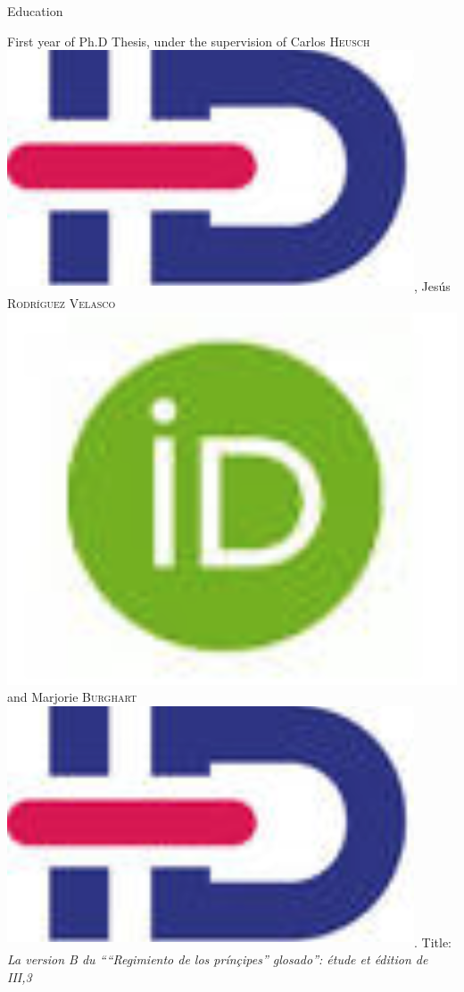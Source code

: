 \begin{rubric}{Education}
                    
                                \entry*[2018-2019]
                            First year of Ph.D Thesis, under the supervision of Carlos \textsc{Heusch}\href{https://www.idref.fr/055838413}{\textsuperscript{\includegraphics[scale=0.025]{img/idref.png}}}, Jesús
                                \textsc{Rodríguez Velasco}\href{https://orcid.org/0000-0002-3848-9230}{\includegraphics[scale=0.025]{img/orcid.png}} and Marjorie
                                \textsc{Burghart}\href{https://www.idref.fr/178995819}{\textsuperscript{\includegraphics[scale=0.025]{img/idref.png}}}. Title: \textit{La version B du
                                    ````Regimiento de los prínçipes'' glosado'':
                            étude et édition de III,3}
                    

\end{rubric}
